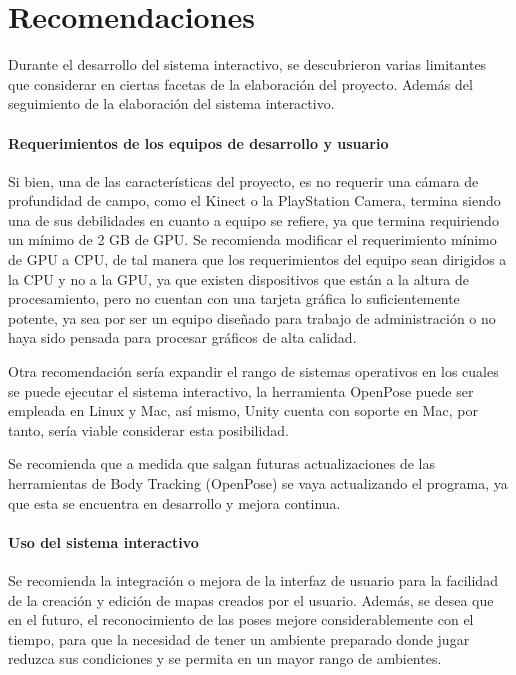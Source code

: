 \chapter{Recomendaciones}

Durante el desarrollo del sistema interactivo, se descubrieron varias limitantes que considerar en ciertas facetas de la elaboración del proyecto. Además del seguimiento de la elaboración del sistema interactivo.

\subsubsection{Requerimientos de los equipos de desarrollo y usuario}

Si bien, una de las características del proyecto, es no requerir una cámara de profundidad de campo, como el Kinect o la PlayStation Camera, termina siendo una de sus debilidades en cuanto a equipo se refiere, ya que termina requiriendo un mínimo de 2 GB de GPU. Se recomienda modificar el requerimiento mínimo de GPU a CPU, de tal manera que los requerimientos del equipo sean dirigidos a la CPU y no a la GPU, ya que existen dispositivos que están a la altura de procesamiento, pero no cuentan con una tarjeta gráfica lo suficientemente potente, ya sea por ser un equipo diseñado para trabajo de administración o no haya sido pensada para procesar gráficos de alta calidad.

Otra recomendación sería expandir el rango de sistemas operativos en los cuales se puede ejecutar el sistema interactivo, la herramienta OpenPose puede ser empleada en Linux y Mac, así mismo, Unity cuenta con soporte en Mac, por tanto, sería viable considerar esta posibilidad.

Se recomienda que a medida que salgan futuras actualizaciones de las herramientas de Body Tracking (OpenPose) se vaya actualizando el programa, ya que esta se encuentra en desarrollo y mejora continua. 

\subsubsection{Uso del sistema interactivo}

Se recomienda la integración o mejora de la interfaz de usuario para la facilidad de la creación y edición de mapas creados por el usuario. Además, se desea que en el futuro, el reconocimiento de las poses mejore considerablemente con el tiempo, para que la necesidad de tener un ambiente preparado donde jugar reduzca sus condiciones y se permita en un mayor rango de ambientes.



